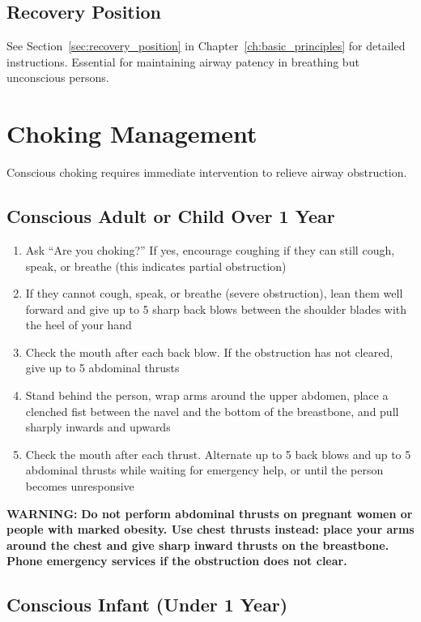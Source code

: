 \subsection{Recovery Position}

See Section~\ref{sec:recovery_position} in Chapter~\ref{ch:basic_principles} for detailed instructions. Essential for maintaining airway patency in breathing but unconscious persons.

\section{Choking Management}

Conscious choking requires immediate intervention to relieve airway obstruction.

\subsection{Conscious Adult or Child Over 1 Year}

\begin{enumerate}[leftmargin=*]
  \item Ask ``Are you choking?'' If yes, encourage coughing if they can still cough, speak, or breathe (this indicates partial obstruction)
  \item If they cannot cough, speak, or breathe (severe obstruction), lean them well forward and give up to 5 sharp back blows between the shoulder blades with the heel of your hand
  \item Check the mouth after each back blow. If the obstruction has not cleared, give up to 5 abdominal thrusts
  \item Stand behind the person, wrap arms around the upper abdomen, place a clenched fist between the navel and the bottom of the breastbone, and pull sharply inwards and upwards
  \item Check the mouth after each thrust. Alternate up to 5 back blows and up to 5 abdominal thrusts while waiting for emergency help, or until the person becomes unresponsive
\end{enumerate}
\textbf{WARNING:} \textbf{Do not perform abdominal thrusts on pregnant women or people with marked obesity. Use chest thrusts instead: place your arms around the chest and give sharp inward thrusts on the breastbone. Phone emergency services if the obstruction does not clear.}

\subsection{Conscious Infant (Under 1 Year)}

